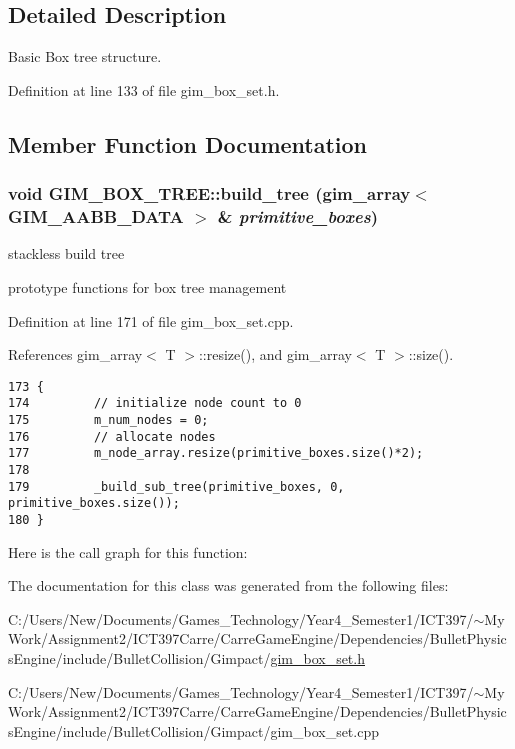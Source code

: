\subsection{Detailed Description}
Basic Box tree structure. 

Definition at line 133 of file gim\_\-box\_\-set.h.

\subsection{Member Function Documentation}
\hypertarget{class_g_i_m___b_o_x___t_r_e_e_f76fa1d2f5e20c8979120fa72cf7575f}{
\subsubsection[build\_\-tree]{\setlength{\rightskip}{0pt plus 5cm}void GIM\_\-BOX\_\-TREE::build\_\-tree ({\bf gim\_\-array}$<$ GIM\_\-AABB\_\-DATA $>$ \& {\em primitive\_\-boxes})}}
\label{class_g_i_m___b_o_x___t_r_e_e_f76fa1d2f5e20c8979120fa72cf7575f}


stackless build tree 

prototype functions for box tree management 

Definition at line 171 of file gim\_\-box\_\-set.cpp.

References gim\_\-array$<$ T $>$::resize(), and gim\_\-array$<$ T $>$::size().

\begin{Code}\begin{verbatim}173 {
174         // initialize node count to 0
175         m_num_nodes = 0;
176         // allocate nodes
177         m_node_array.resize(primitive_boxes.size()*2);
178         
179         _build_sub_tree(primitive_boxes, 0, primitive_boxes.size());
180 }
\end{verbatim}
\end{Code}




Here is the call graph for this function:

The documentation for this class was generated from the following files:\begin{CompactItemize}
\item 
C:/Users/New/Documents/Games\_\-Technology/Year4\_\-Semester1/ICT397/$\sim$My Work/Assignment2/ICT397Carre/CarreGameEngine/Dependencies/BulletPhysicsEngine/include/BulletCollision/Gimpact/\hyperlink{gim__box__set_8h}{gim\_\-box\_\-set.h}\item 
C:/Users/New/Documents/Games\_\-Technology/Year4\_\-Semester1/ICT397/$\sim$My Work/Assignment2/ICT397Carre/CarreGameEngine/Dependencies/BulletPhysicsEngine/include/BulletCollision/Gimpact/gim\_\-box\_\-set.cpp\end{CompactItemize}
